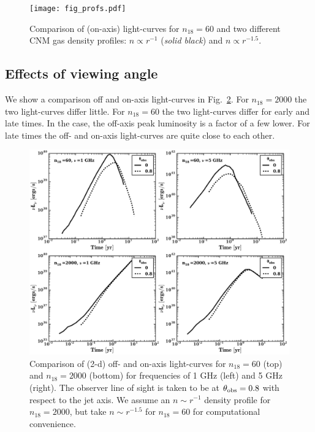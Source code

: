 \documentclass[usenatbib,fleqn]{mnras}
\begin{document}
\begin{figure} 
  \texttt{[image: fig\_profs.pdf]}
  \caption{\label{fig:profs2} Comparison of (on-axis) light-curves for
    $n_{18}=60$ and two different CNM gas density profiles: $n\propto
    r^{-1}$ ({\it solid black}) and $n\propto r^{-1.5}$.}
\end{figure}

\subsection{Effects of viewing angle}
We show a comparison off and on-axis light-curves in
Fig.~\ref{fig:onOff}.  For $n_{18}=2000$ the two light-curves differ
little.  For $n_{18}=60$ the two light-curves differ for early and
late times. In the case, the off-axis peak luminosity is a factor of a
few lower. For late times the off- and on-axis light-curves are quite
close to each other.


\begin{figure}
\includegraphics[width=16cm]{on_off.pdf}
\caption{\label{fig:onOff} Comparison of (2-d) off- and on-axis
  light-curves for $n_{18}=60$ (top) and $n_{18}=2000$ (bottom) for
  frequencies of 1 GHz (left) and 5 GHz (right). The observer line of
  sight is taken to be at $\theta_{\rm obs}=0.8$ with respect to the
  jet axis. We assume an $n\sim r^{-1}$ density profile for
  $n_{18}=2000$, but take $n\sim r^{-1.5}$ for $n_{18}=60$ for
  computational convenience.}
\end{figure}
\end{document}
